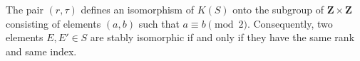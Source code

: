 The pair $(r, \tau)$ defines an isomorphism of $K(S)$ onto the subgroup of $\mathbf{Z} \times \mathbf{Z}$ consisting of elements $(a, b)$ such that $a \equiv b \pmod{2}$. Consequently, two elements $E, E' \in S$ are stably isomorphic if and only if they have the same rank and same index.
